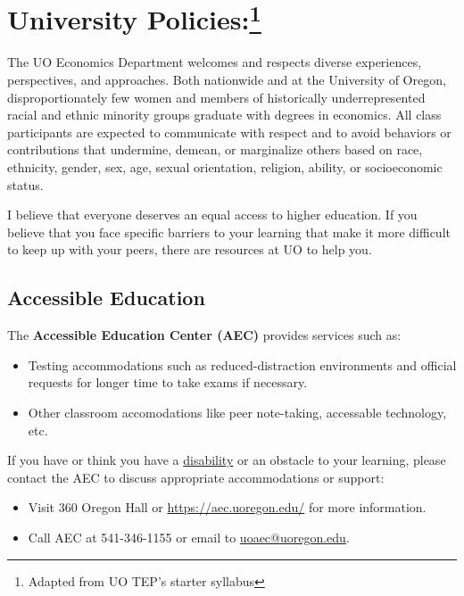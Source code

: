 \section*{University Policies:\footnote{Adapted from UO TEP's starter syllabus}}

The UO Economics Department welcomes and respects diverse experiences, perspectives, and approaches. Both nationwide and at the University of Oregon, disproportionately few women and members of historically underrepresented racial and ethnic minority groups graduate with degrees in economics. All class participants are expected to communicate with respect and to avoid behaviors or contributions that undermine, demean, or marginalize others based on race, ethnicity, gender, sex, age, sexual orientation, religion, ability, or socioeconomic status.

I believe that everyone deserves an equal access to higher education.
If you believe that you face specific barriers to your learning that make it more difficult to keep up with your peers, there are resources at UO to help you.

\subsection*{Accessible Education}

The \textbf{Accessible Education Center (AEC)} provides services such as:

\begin{itemize}

\item Testing accommodations such as reduced-distraction environments and official requests for longer time to take exams if necessary.

\item Other classroom accomodations like peer note-taking, accessable technology, etc.

\end{itemize}

If you have or think you have a \href{https://aec.uoregon.edu/content/what-disability}{disability} or an obstacle to your learning, please contact the AEC to discuss appropriate accommodations or support:
\begin{itemize}
\item Visit 360 Oregon Hall or \url{https://aec.uoregon.edu/} for more information.
\item Call AEC at 541-346-1155 or email to \href{mailto:uoaec@uoregon.edu}{uoaec@uoregon.edu}.
\end{itemize}

